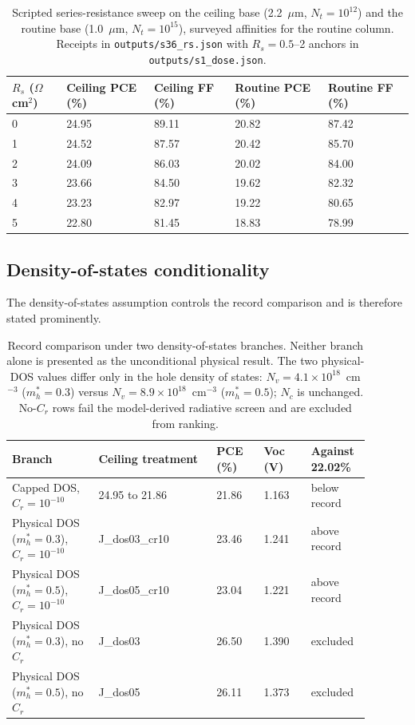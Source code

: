 \documentclass[11pt,a4paper]{article}
\begin{document}
\begin{table}[tbp]
\centering
\caption{Scripted series-resistance sweep on the ceiling base (2.2~$\mu$m, $N_t=10^{12}$) and the routine base (1.0~$\mu$m, $N_t=10^{15}$), surveyed affinities for the routine column. Receipts in \texttt{outputs/s36\_rs.json} with $R_s=0.5$--2 anchors in \texttt{outputs/s1\_dose.json}.}
\label{tab:rs}
\begin{tabular}{|l|l|l|l|l|}
\hline\hline
$R_s$ ($\Omega$cm$^2$) & Ceiling PCE (\%) & Ceiling FF (\%) & Routine PCE (\%) & Routine FF (\%) \\
\hline
0 & 24.95 & 89.11 & 20.82 & 87.42 \\
1 & 24.52 & 87.57 & 20.42 & 85.70 \\
2 & 24.09 & 86.03 & 20.02 & 84.00 \\
3 & 23.66 & 84.50 & 19.62 & 82.32 \\
4 & 23.23 & 82.97 & 19.22 & 80.65 \\
5 & 22.80 & 81.45 & 18.83 & 78.99 \\
\hline\hline
\end{tabular}
\end{table}

\subsection{Density-of-states conditionality}

The density-of-states assumption controls the record comparison and is therefore stated prominently.

\begin{table}[tbp]
\centering
\caption{Record comparison under two density-of-states branches. Neither branch alone is presented as the unconditional physical result. The two physical-DOS values differ only in the hole density of states: $N_v=4.1\times10^{18}$~cm$^{-3}$ ($m_h^*=0.3$) versus $N_v=8.9\times10^{18}$~cm$^{-3}$ ($m_h^*=0.5$); $N_c$ is unchanged. No-$C_r$ rows fail the model-derived radiative screen and are excluded from ranking.}
\label{tab:dos}
\small
\begingroup
\setlength{\tabcolsep}{3pt}
\begin{tabular}{|p{0.22\linewidth}|p{0.30\linewidth}|p{0.12\linewidth}|p{0.12\linewidth}|p{0.13\linewidth}|}
\hline\hline
Branch & Ceiling treatment & PCE (\%) & Voc (V) & Against 22.02\% \\
\hline
Capped DOS, $C_r=10^{-10}$ & 24.95 to 21.86 & 21.86 & 1.163 & below record \\
Physical DOS ($m_h^*=0.3$), $C_r=10^{-10}$ & J\_dos03\_cr10 & 23.46 & 1.241 & above record \\
Physical DOS ($m_h^*=0.5$), $C_r=10^{-10}$ & J\_dos05\_cr10 & 23.04 & 1.221 & above record \\
Physical DOS ($m_h^*=0.3$), no $C_r$ & J\_dos03 & 26.50 & 1.390 & excluded \\
Physical DOS ($m_h^*=0.5$), no $C_r$ & J\_dos05 & 26.11 & 1.373 & excluded \\
\hline\hline
\end{tabular}
\endgroup
\end{table}
\end{document}
